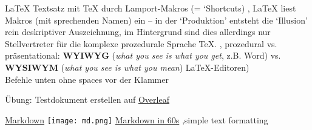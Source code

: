 \begin{frame}{\LaTeX}
 Textsatz mit \TeX{} durch Lamport-Makros (= `Shortcuts) \sep
\LaTeX{} liest Makros (mit sprechenden Namen) ein -- in der `Produktion' entsteht die `Illusion' rein deskriptiver Auszeichnung, im Hintergrund sind dies allerdings nur Stellvertreter für die komplexe prozedurale Sprache \TeX . \sep 
prozedural vs. präsentational: \textbf{WYIWYG} (\emph{what you see is what you get}, z.B. Word) vs. \textbf{WYSIWYM} (\emph{what you see is what you mean}) \LaTeX{}-Editoren) \\


\footnotesize
Befehle unten ohne spaces vor der Klammer \\

\end{frame}

\begin{frame}[standout]
  Übung: Testdokument erstellen auf \alert{\href{https://www.overleaf.com/}{\faCode Overleaf}}
\end{frame}



\begin{frame}{\href{https://commonmark.org/help}{Markdown}}
\texttt{[image: md.png]}
\href{https://commonmark.org/help}{Markdown in 60s} \sep simple text formatting ~
\\

\footnotesize
{}
\mycommand{![Image][http://url/a.png}{Bild}
\normalsize
\end{frame}

